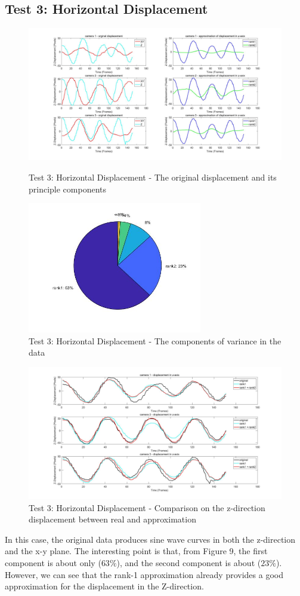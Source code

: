 \documentclass{article}
\begin{document}
\subsection{Test 3: Horizontal Displacement}
\begin{figure}[h]
    \centerline{\includegraphics[width=8in]{case31.jpg}}
    \caption{Test 3: Horizontal Displacement - The original displacement and its principle components}
    \centerline{\includegraphics[width=3in]{case32.jpg}}
    \caption{Test 3: Horizontal Displacement - The components of variance in the data}
\end{figure}
\begin{figure}[h]
    \centerline{\includegraphics[width=8in]{case33.jpg}}
    \caption{Test 3: Horizontal Displacement - Comparison on the z-direction displacement between real and approximation}
\end{figure}
In this case, the original data produces sine wave curves in both the z-direction and the x-y plane. The interesting point is that, from Figure 9, the first component is about only ($63\%$), and the second component is about ($23\%$). However, we can see that the rank-1 approximation already provides a good approximation for the displacement in the Z-direction.
\end{document}
